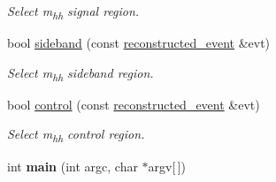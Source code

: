 \begin{DoxyCompactItemize}
\begin{DoxyCompactList}\small\item\em Select m\textsubscript{hh} signal region. \end{DoxyCompactList}\item 
\mbox{\label{resolved-recon_8cpp_a07199ec7469a62e534751d223c19eee8}} 
bool \mbox{\hyperlink{resolved-recon_8cpp_a07199ec7469a62e534751d223c19eee8}{sideband}} (const \mbox{\hyperlink{structreconstructed__event}{reconstructed\+\_\+event}} \&evt)
\begin{DoxyCompactList}\small\item\em Select m\textsubscript{hh} sideband region. \end{DoxyCompactList}\item 
\mbox{\label{resolved-recon_8cpp_ac3920583732d6dbb6384c6bd00636972}} 
bool \mbox{\hyperlink{resolved-recon_8cpp_ac3920583732d6dbb6384c6bd00636972}{control}} (const \mbox{\hyperlink{structreconstructed__event}{reconstructed\+\_\+event}} \&evt)
\begin{DoxyCompactList}\small\item\em Select m\textsubscript{hh} control region. \end{DoxyCompactList}\item 
\mbox{\label{resolved-recon_8cpp_a0ddf1224851353fc92bfbff6f499fa97}} 
int {\bfseries main} (int argc, char $\ast$argv\mbox{[}$\,$\mbox{]})
\end{DoxyCompactItemize}
